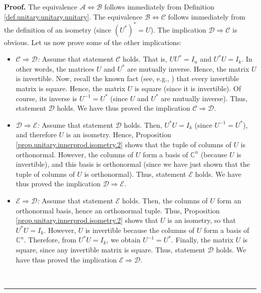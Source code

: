 \documentclass[numbers=enddot,12pt,final,onecolumn,notitlepage]{scrartcl}%
\numberwithin{exer}{subsection}
\theoremstyle{definition}
\newenvironment{proof}[1][Proof]{\noindent\textbf{#1.} }{\ \rule{0.5em}{0.5em}}
\begin{document}
\begin{proof}
The equivalence $\mathcal{A}\Longleftrightarrow\mathcal{B}$ follows
immediately from Definition \ref{def.unitary.unitary.unitary}. The equivalence
$\mathcal{B}\Longleftrightarrow\mathcal{C}$ follows immediately from the
definition of an isometry (since $\left(  U^{\ast}\right)  ^{\ast}=U$). The
implication $\mathcal{D}\Longrightarrow\mathcal{C}$ is obvious. Let us now
prove some of the other implications:

\begin{itemize}
\item $\mathcal{C}\Longrightarrow\mathcal{D}$\textit{:} Assume that statement
$\mathcal{C}$ holds. That is, $UU^{\ast}=I_{n}$ and $U^{\ast}U=I_{k}$. In
other words, the matrices $U$ and $U^{\ast}$ are mutually inverse. Hence, the
matrix $U$ is invertible. Now, recall the known fact (see, e.g., \cite[Chapter
2, Corollary 3.7]{Treil15}) that every invertible matrix is square. Hence, the
matrix $U$ is square (since it is invertible). Of course, its inverse is
$U^{-1}=U^{\ast}$ (since $U$ and $U^{\ast}$ are mutually inverse). Thus,
statement $\mathcal{D}$ holds. We have thus proved the implication
$\mathcal{C}\Longrightarrow\mathcal{D}$.

\item $\mathcal{D}\Longrightarrow\mathcal{E}$\textit{:} Assume that statement
$\mathcal{D}$ holds. Then, $U^{\ast}U=I_{k}$ (since $U^{-1}=U^{\ast}$), and
therefore $U$ is an isometry. Hence, Proposition
\ref{prop.unitary.innerprod.isometry.2} shows that the tuple of columns of $U$
is orthonormal. However, the columns of $U$ form a basis of $\mathbb{C}^{n}$
(because $U$ is invertible), and this basis is orthonormal (since we have just
shown that the tuple of columns of $U$ is orthonormal). Thus, statement
$\mathcal{E}$ holds. We have thus proved the implication $\mathcal{D}%
\Longrightarrow\mathcal{E}$.

\item $\mathcal{E}\Longrightarrow\mathcal{D}$\textit{:} Assume that statement
$\mathcal{E}$ holds. Then, the columns of $U$ form an orthonormal basis, hence
an orthonormal tuple. Thus, Proposition
\ref{prop.unitary.innerprod.isometry.2} shows that $U$ is an isometry, so that
$U^{\ast}U=I_{k}$. However, $U$ is invertible because the columns of $U$ form
a basis of $\mathbb{C}^{n}$. Therefore, from $U^{\ast}U=I_{k}$, we obtain
$U^{-1}=U^{\ast}$. Finally, the matrix $U$ is square, since any invertible
matrix is square. Thus, statement $\mathcal{D}$ holds. We have thus proved the
implication $\mathcal{E}\Longrightarrow\mathcal{D}$.


\end{itemize}
\end{proof}
\end{document}
